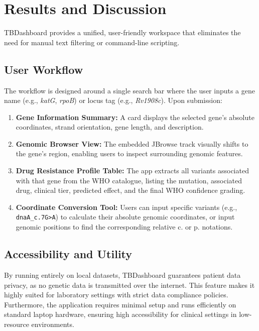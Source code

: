 \documentclass{article}
\begin{document}
\section{Results and Discussion}
TBDashboard provides a unified, user-friendly workspace that eliminates the need for manual text filtering or command-line scripting. 

\subsection{User Workflow}
The workflow is designed around a single search bar where the user inputs a gene name (e.g., \textit{katG}, \textit{rpoB}) or locus tag (e.g., \textit{Rv1908c}). Upon submission:
\begin{enumerate}
    \item \textbf{Gene Information Summary:} A card displays the selected gene's absolute coordinates, strand orientation, gene length, and description.
    \item \textbf{Genomic Browser View:} The embedded JBrowse track visually shifts to the gene's region, enabling users to inspect surrounding genomic features.
    \item \textbf{Drug Resistance Profile Table:} The app extracts all variants associated with that gene from the WHO catalogue, listing the mutation, associated drug, clinical tier, predicted effect, and the final WHO confidence grading.
    \item \textbf{Coordinate Conversion Tool:} Users can input specific variants (e.g., \texttt{dnaA\_c.7G\textgreater{}A}) to calculate their absolute genomic coordinates, or input genomic positions to find the corresponding relative c. or p. notations.
\end{enumerate}

\subsection{Accessibility and Utility}
By running entirely on local datasets, TBDashboard guarantees patient data privacy, as no genetic data is transmitted over the internet. This feature makes it highly suited for laboratory settings with strict data compliance policies. Furthermore, the application requires minimal setup and runs efficiently on standard laptop hardware, ensuring high accessibility for clinical settings in low-resource environments. 
\end{document}

